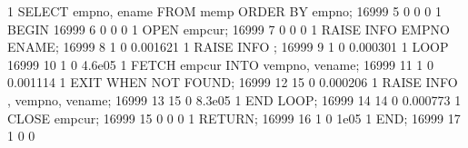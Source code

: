 \documentclass[letterpaper,10pt,english,openany,oneside]{sphinxmanual}
\begin{document}
\begin{sphinxVerbatim}[commandchars=\\\{\}]
    1 \textbar{}         SELECT empno, ename FROM memp ORDER BY empno;            \textbar{}    16999 \textbar{}           5 \textbar{}          0 \textbar{}               0 \textbar{}          0
    1 \textbar{} BEGIN                                                            \textbar{}    16999 \textbar{}           6 \textbar{}          0 \textbar{}               0 \textbar{}          0
    1 \textbar{}     OPEN emp\PYGZus{}cur;                                                \textbar{}    16999 \textbar{}           7 \textbar{}          0 \textbar{}               0 \textbar{}          0
    1 \textbar{}     RAISE INFO \PYGZsq{}EMPNO    ENAME\PYGZsq{};                                 \textbar{}    16999 \textbar{}           8 \textbar{}          1 \textbar{}               0 \textbar{}   0.001621
    1 \textbar{}     RAISE INFO \PYGZsq{}\PYGZhy{}\PYGZhy{}\PYGZhy{}\PYGZhy{}\PYGZhy{}    \PYGZhy{}\PYGZhy{}\PYGZhy{}\PYGZhy{}\PYGZhy{}\PYGZhy{}\PYGZhy{}\PYGZsq{};                               \textbar{}    16999 \textbar{}           9 \textbar{}          1 \textbar{}               0 \textbar{}   0.000301
    1 \textbar{}     LOOP                                                         \textbar{}    16999 \textbar{}          10 \textbar{}          1 \textbar{}               0 \textbar{}    4.6e\PYGZhy{}05
    1 \textbar{}         FETCH emp\PYGZus{}cur INTO v\PYGZus{}empno, v\PYGZus{}ename;                     \textbar{}    16999 \textbar{}          11 \textbar{}          1 \textbar{}               0 \textbar{}   0.001114
    1 \textbar{}         EXIT WHEN NOT FOUND;                                     \textbar{}    16999 \textbar{}          12 \textbar{}         15 \textbar{}               0 \textbar{}   0.000206
    1 \textbar{}         RAISE INFO \PYGZsq{}\PYGZpc{}     \PYGZpc{}\PYGZsq{}, v\PYGZus{}empno, v\PYGZus{}ename;                  \textbar{}    16999 \textbar{}          13 \textbar{}         15 \textbar{}               0 \textbar{}    8.3e\PYGZhy{}05
    1 \textbar{}     END LOOP;                                                    \textbar{}    16999 \textbar{}          14 \textbar{}         14 \textbar{}               0 \textbar{}   0.000773
    1 \textbar{}     CLOSE emp\PYGZus{}cur;                                               \textbar{}    16999 \textbar{}          15 \textbar{}          0 \textbar{}               0 \textbar{}          0
    1 \textbar{}     RETURN;                                                      \textbar{}    16999 \textbar{}          16 \textbar{}          1 \textbar{}               0 \textbar{}      1e\PYGZhy{}05
    1 \textbar{} END;                                                             \textbar{}    16999 \textbar{}          17 \textbar{}          1 \textbar{}               0 \textbar{}          0

\end{sphinxVerbatim}
\end{document}
